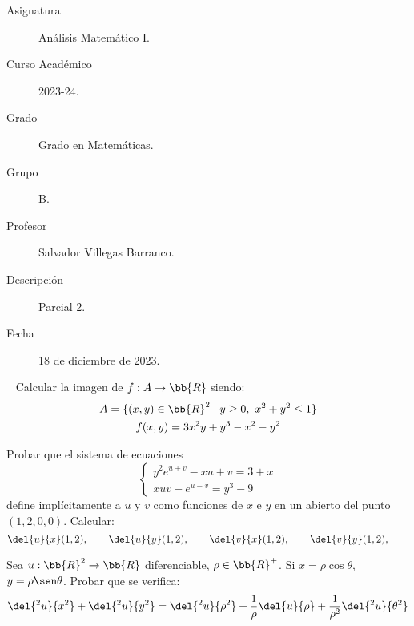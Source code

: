 \documentclass[12pt]{article}
\begin{document}

    
    

    \begin{description}
        \item[Asignatura] Análisis Matemático I.
        \item[Curso Académico] 2023-24.
        \item[Grado] Grado en Matemáticas.
        \item[Grupo] B.
        \item[Profesor] Salvador Villegas Barranco.
        \item[Descripción] Parcial 2.
        \item[Fecha] 18 de diciembre de 2023.
    
    \end{description}
    \newpage
    
    \begin{ejercicio}[4 puntos]~
        Calcular la imagen de $f:A\to \bb{R}$ siendo:
        \begin{gather*}
            A = \{(x,y)\in \bb{R}^2\mid y\geq 0,~x^2+y^2\leq 1\} \\
            f(x,y) = 3x^2y + y^3-x^2-y^2
        \end{gather*}
    \end{ejercicio}

    \begin{ejercicio}[3 puntos] Probar que el sistema de ecuaciones
    \begin{equation*}
        \left\{\begin{array}{c}
            y^2e^{u+v} -xu + v=3+x \\
            xuv - e^{u-v} = y^3-9
        \end{array}\right.
    \end{equation*}
    define implícitamente a $u$ y $v$ como funciones de $x$ e $y$ en un abierto del punto $(1,2,0,0)$. Calcular:
    \begin{equation*}
        \del{u}{x}(1,2), \qquad
        \del{u}{y}(1,2), \qquad
        \del{v}{x}(1,2), \qquad
        \del{v}{y}(1,2), \qquad
    \end{equation*}
    \end{ejercicio}

    \begin{ejercicio}[3 puntos] Sea $u:\bb{R}^2\to \bb{R}$ diferenciable, $\rho\in \bb{R}^+$. Si $x=\rho\cos\theta$, $y=\rho\sen\theta$. Probar que se verifica:
    \begin{equation*}
        \del{^2u}{x^2} + \del{^2u}{y^2} = \del{^2u}{\rho^2} + \frac{1}{\rho} \del{u}{\rho} + \frac{1}{\rho^2} \del{^2u}{\theta^2}
    \end{equation*}
    \end{ejercicio}
\end{document}

